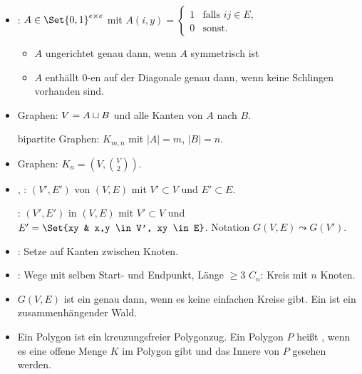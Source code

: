 \begin{df}
    \begin{itemize}
        \item
            : $A \in \Set{0,1}^{e \times e}$ mit
            \begin{math}
                A(i,y) = \begin{cases}
                    1 & \text{falls $ij \in E$}, \\
                    0 & \text{sonst}.
                \end{cases}
            \end{math}
            \begin{itemize}
                \item
                    $A$ ungerichtet genau dann, wenn $A$ symmetrisch ist
                \item
                    $A$ enthällt $0$-en auf der Diagonale genau dann, wenn keine Schlingen vorhanden sind.
            \end{itemize}
        \item
             Graphen: $V = A \sqcup B$ und alle Kanten von $A$ nach $B$.

             bipartite Graphen: $K_{m,n}$ mit $|A| = m$, $|B| = n$.
        \item
             Graphen: $K_n = (V, \binom{V}{2})$.
        \item
            , : $(V', E')$ von $(V, E)$ mit $V' \subset V$ und $E' \subset E$.

            : $(V', E')$ in $(V, E)$ mit $V' \subset V$ und $E' = \Set{xy & x,y \in V', xy \in E}$.
            Notation $G(V,E) \leadsto G(V')$.
        \item
            : Setze auf Kanten zwischen Knoten.
        \item
            : Wege mit selben Start- und Endpunkt, Länge $\ge 3$
            $C_n$: Kreis mit $n$ Knoten.
        \item
            $G(V, E)$ ist ein  genau dann, wenn es keine einfachen Kreise gibt.
            Ein  ist ein zusammenhängender Wald.
        \item
            Ein Polygon ist ein kreuzungsfreier Polygonzug.
            Ein Polygon $P$ heißt , wenn es eine offene Menge $K$ im Polygon gibt und das Innere von $P$ gesehen werden.
    \end{itemize}
\end{df}

